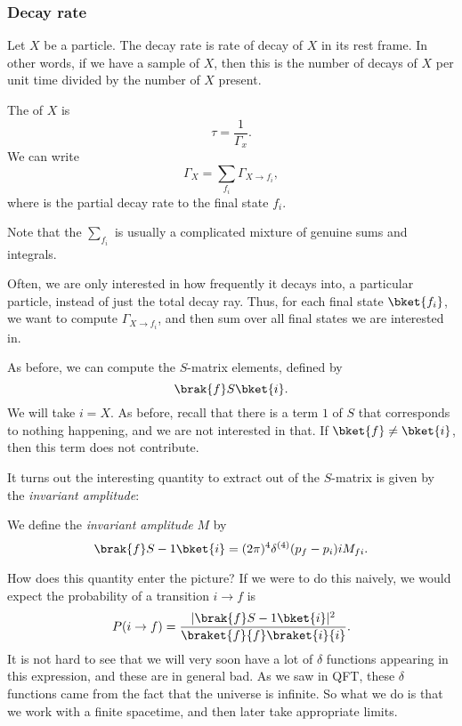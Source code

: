 \documentclass[a4paper]{article}
\begin{document}
\subsubsection*{Decay rate}
\begin{defi}
  Let $X$ be a particle. The decay rate  is rate of decay of $X$ in its rest frame. In other words, if we have a sample of $X$, then this is the number of decays of $X$ per unit time divided by the number of $X$ present.

  The  of $X$ is
  \[
    \tau = \frac{1}{\Gamma_x}.
  \]
  We can write
  \[
    \Gamma_X = \sum_{f_i} \Gamma_{X \to f_i},
  \]
  where  is the partial decay rate to the final state $f_i$.
\end{defi}
Note that the $\sum_{f_i}$ is usually a complicated mixture of genuine sums and integrals.

Often, we are only interested in how frequently it decays into, a particular particle, instead of just the total decay ray. Thus, for each final state $\bket{f_i}$, we want to compute $\Gamma_{X \to f_i}$, and then sum over all final states we are interested in.

As before, we can compute the $S$-matrix elements, defined by
\[
  \brak{f} S\bket{i}.
\]
We will take $i = X$. As before, recall that there is a term $1$ of $S$ that corresponds to nothing happening, and we are not interested in that. If $\bket{f} \not= \bket{i}$, then this term does not contribute.

It turns out the interesting quantity to extract out of the $S$-matrix is given by the \emph{invariant amplitude}:
\begin{defi}
  We define the \emph{invariant amplitude} $M$ by
  \[
    \brak{f}S - 1 \bket{i} = (2\pi)^4 \delta^{(4)}(p_f - p_i) i M_{fi}.
  \]
\end{defi}
How does this quantity enter the picture? If we were to do this naively, we would expect the probability of a transition $i \to f$ is
\[
  P(i \to f) = \frac{|\brak{f}S - 1 \bket{i}|^2}{\braket{f}{f}\braket{i}{i}}.
\]
It is not hard to see that we will very soon have a lot of $\delta$ functions appearing in this expression, and these are in general bad. As we saw in QFT, these $\delta$ functions came from the fact that the universe is infinite. So what we do is that we work with a finite spacetime, and then later take appropriate limits.
\end{document}
